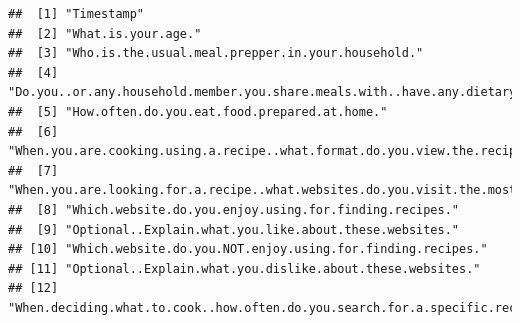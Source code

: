 \documentclass[
]{article}
\begin{document}
\begin{verbatim}
##  [1] "Timestamp"                                                                                                                                                                                                 
##  [2] "What.is.your.age."                                                                                                                                                                                         
##  [3] "Who.is.the.usual.meal.prepper.in.your.household."                                                                                                                                                          
##  [4] "Do.you..or.any.household.member.you.share.meals.with..have.any.dietary.restrictions."                                                                                                                      
##  [5] "How.often.do.you.eat.food.prepared.at.home."                                                                                                                                                               
##  [6] "When.you.are.cooking.using.a.recipe..what.format.do.you.view.the.recipe.in..Select.all.that.apply"                                                                                                         
##  [7] "When.you.are.looking.for.a.recipe..what.websites.do.you.visit.the.most.."                                                                                                                                  
##  [8] "Which.website.do.you.enjoy.using.for.finding.recipes."                                                                                                                                                     
##  [9] "Optional..Explain.what.you.like.about.these.websites."                                                                                                                                                     
## [10] "Which.website.do.you.NOT.enjoy.using.for.finding.recipes."                                                                                                                                                 
## [11] "Optional..Explain.what.you.dislike.about.these.websites."                                                                                                                                                  
## [12] "When.deciding.what.to.cook..how.often.do.you.search.for.a.specific.recipe.in.the.search.bar.provided.by.your.website.of.choice."                                                                           

\end{verbatim}
\end{document}
